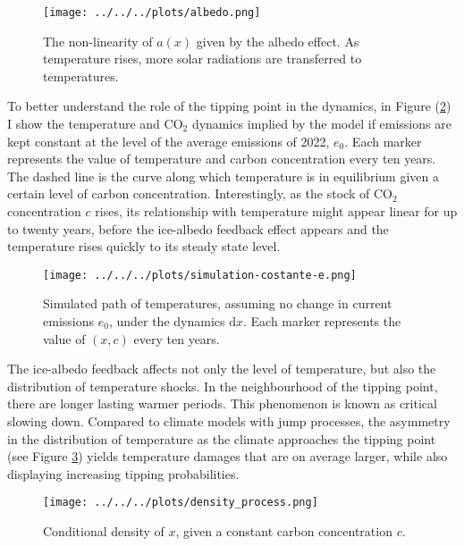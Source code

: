 \documentclass[../../main.tex]{subfiles}
\begin{document}
\begin{figure}[H]
    \centering
    \texttt{[image: ../../../plots/albedo.png]}
    \caption{The non-linearity of $a(x)$ given by the albedo effect. As temperature rises, more solar radiations are transferred to temperatures.}
    \label{fig:albedo}
\end{figure}

To better understand the role of the tipping point in the dynamics, in Figure (\ref{fig:x-sim}) I show the temperature and CO$_2$ dynamics implied by the model if emissions are kept constant at the level of the average emissions of 2022, $e_0$. Each marker represents the value of temperature and carbon concentration every ten years. The dashed line is the curve along which temperature is in equilibrium given a certain level of carbon concentration. Interestingly, as the stock of CO$_2$ concentration $c$ rises, its relationship with temperature might appear linear for up to twenty years, before the ice-albedo feedback effect appears and the temperature rises quickly to its steady state level.


\begin{figure}[H]
    \centering
    \texttt{[image: ../../../plots/simulation-costante-e.png]}
    \caption{Simulated path of temperatures, assuming no change in current emissions $e_0$, under the dynamics $\text{d}x$. Each marker represents the value of $(x, c)$ every ten years.}
    \label{fig:x-sim}
\end{figure}

The ice-albedo feedback affects not only the level of temperature, but also the distribution of temperature shocks. In the neighbourhood of the tipping point, there are longer lasting warmer periods. This phenomenon is known as critical slowing down. Compared to climate models with jump processes, the asymmetry in the distribution of temperature as the climate approaches the tipping point (see Figure \ref{fig:x-dens}) yields temperature damages that are on average larger, while also displaying increasing tipping probabilities.

\begin{figure}[H]
    \centering
    \texttt{[image: ../../../plots/density\_process.png]}
    \caption{Conditional density of $x$, given a constant carbon concentration $c$.}
    \label{fig:x-dens}
\end{figure}
\end{document}
